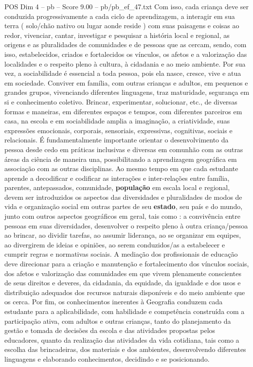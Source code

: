 \begin{textsample}{POS Dim 4 – pb – Score 9.00 – pb/pb\_ef\_47.txt}
Com isso, cada criança deve ser conduzida progressivamente a cada ciclo de aprendizagem, a interagir em sua terra ( solo/chão nativo ou lugar aonde reside ) com suas paisagens e coisas ao redor, vivenciar, cantar, investigar e pesquisar a história local e regional, as origens e as pluralidades de comunidades e de pessoas que as cercam, sendo, com isso, estabelecidos, criados e fortalecidos os vínculos, os afetos e a valorização das localidades e o respeito pleno à cultura, à cidadania e ao meio ambiente.
Por sua vez, a sociabilidade é essencial a toda pessoa, pois ela nasce, cresce, vive e atua em sociedade.
Conviver em família, com outras crianças e adultos, em pequenos e grandes grupos, vivenciando diferentes linguagens, traz maturidade, segurança em si e conhecimento coletivo.
Brincar, experimentar, solucionar, etc., de diversas formas e maneiras, em diferentes espaços e tempos, com diferentes parceiros em casa, na escola e em sociabilidade amplia a imaginação, a criatividade, suas expressões emocionais, corporais, sensoriais, expressivas, cognitivas, sociais e relacionais.
É fundamentalmente importante orientar o desenvolvimento da pessoa desde cedo em práticas inclusivas e diversas em comunhão com as outras áreas da ciência de maneira una, possibilitando a aprendizagem geográfica em associação com as outras disciplinas.
Ao mesmo tempo em que cada estudante aprende a decodificar e codificar as interações e inter-relações entre família, parentes, antepassados, comunidade, \textbf{população} em escala local e regional, devem ser introduzidos os aspectos das diversidades e pluralidades de modos de vida e organização social em outras partes de seu \textbf{estado}, seu país e do mundo, junto com outros aspectos geográficos em geral, tais como : a convivência entre pessoas em suas diversidades, desenvolver o respeito pleno à outra criança/pessoa ao brincar, ao dividir tarefas, ao assumir liderança, ao se organizar em equipes, ao divergirem de ideias e opiniões, ao serem conduzidos/as a estabelecer e cumprir regras e normativas sociais.
A mediação dos profissionais de educação deve direcionar para a criação e manutenção e fortalecimento dos vínculos sociais, dos afetos e valorização das comunidades em que vivem plenamente conscientes de seus direitos e deveres, da cidadania, da equidade, da igualdade e dos usos e distribuição adequados dos recursos naturais disponíveis e do meio ambiente que os cerca.
Por fim, os conhecimentos inerentes à Geografia conduzem cada estudante para a aplicabilidade, com habilidade e competência construída com a participação ativa, com adultos e outras crianças, tanto do planejamento da gestão e tomada de decisões da escola e das atividades propostas pelos educadores, quanto da realização das atividades da vida cotidiana, tais como a escolha das brincadeiras, dos materiais e dos ambientes, desenvolvendo diferentes linguagens e elaborando conhecimentos, decidindo e se posicionando.

\end{textsample}
